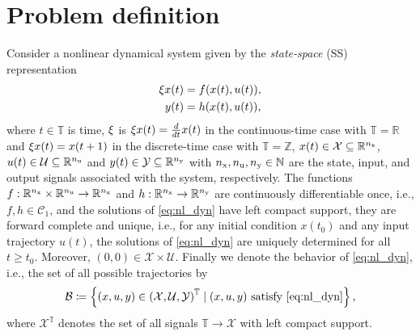 \section{Problem definition\label{sec:probdef}}

Consider a nonlinear dynamical system given by the \emph{state-space} (SS) representation 
\begin{subequations}
	\label{eq:nl_dyn}
\begin{align}
		\xi x(t) & = f(x(t), u(t)), \\
		y(t)       & = h(x(t), u(t)),
\end{align}
\end{subequations}
where $t \in \mathbb{T}$ is time, $\xi$ is $\xi x(t)= \frac{d}{dt}x(t)$ in the continuous-time case with $\mathbb{T}=\mathbb{R}$ and $\xi x(t)= x(t+1)$ in the discrete-time case with $\mathbb{T}=\mathbb{Z}$, $x(t) \in \mathcal{X} \subseteq \mathbb{R}^{n_\mathrm{x}}$, $u(t) \in \mathcal{U} \subseteq \mathbb{R}^{n_\mathrm{u}}$ and $y(t) \in \mathcal{Y} \subseteq \mathbb{R}^{n_\mathrm{y}}$ with $n_\mathrm{x}, n_\mathrm{u}, n_\mathrm{y} \in \mathbb{N}$ are the state, input, and output signals associated with the system, respectively. The functions $f: \mathbb{R}^{n_\mathrm{x}} \times \mathbb{R}^{n_\mathrm{u}} \to \mathbb{R}^{n_\mathrm{x}}$ and $h: \mathbb{R}^{n_\mathrm{x}} \to \mathbb{R}^{n_\mathrm{y}}$ are continuously differentiable once, i.e., $f, h \in \mathcal{C}_1$, and the solutions of \eqref{eq:nl_dyn} have left compact support, they are forward complete and unique, i.e., for any initial condition $x(t_0)$ and any input trajectory $u(t)$, the solutions of \eqref{eq:nl_dyn} are uniquely determined for all $t \geq t_0$. Moreover, $(0, 0) \in \mathcal{X} \times \mathcal{U}$. Finally we denote the behavior of \eqref{eq:nl_dyn}, i.e., the set of all possible trajectories by
%
\begin{equation}
	\label{eq:nl_behavior}
	\mathcal{B} \coloneq \left\{ (x, u, y) \in \left(\mathcal{X}, \mathcal{U}, \mathcal{Y}\right)^{\mathbb{T}} \mid (x, u, y) ~ \text{satisfy}~\eqref{eq:nl_dyn} \right\},
\end{equation}
%
where $\mathcal{X}^{\mathbb{T}}$ denotes the set of all signals $\mathbb{T} \rightarrow \mathcal{X}$ with left compact support.


